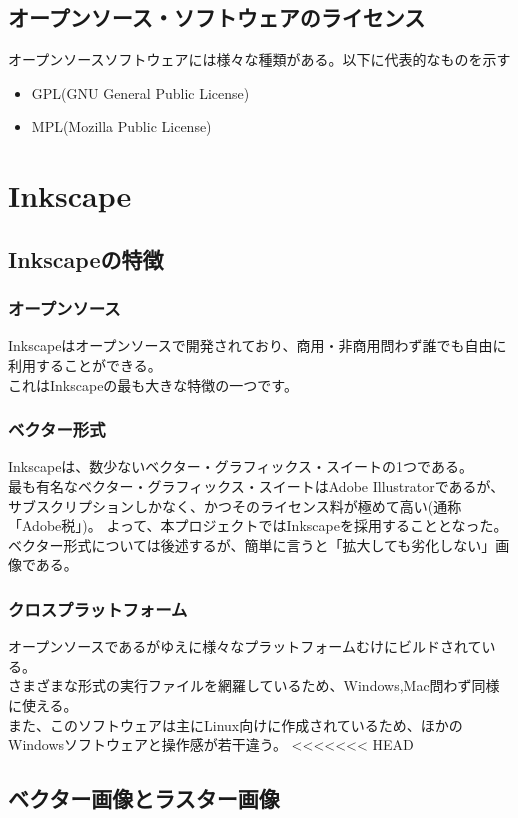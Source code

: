 \documentclass{ltjsarticle}
\begin{document}
\subsection{オープンソース・ソフトウェアのライセンス}
オープンソースソフトウェアには様々な種類がある。以下に代表的なものを示す
\begin{itemize}
    \item GPL(GNU General Public License)
    \item MPL(Mozilla Public License)
\end{itemize}
\section{Inkscape}
\subsection{Inkscapeの特徴}
\subsubsection{オープンソース}
Inkscapeはオープンソースで開発されており、商用・非商用問わず誰でも自由に利用することができる。\\
これはInkscapeの最も大きな特徴の一つです。
\subsubsection{ベクター形式}
Inkscapeは、数少ないベクター・グラフィックス・スイートの1つである。\\
最も有名なベクター・グラフィックス・スイートはAdobe Illustratorであるが、サブスクリプションしかなく、かつそのライセンス料が極めて高い(通称「Adobe税」)。
よって、本プロジェクトではInkscapeを採用することとなった。\\
ベクター形式については後述するが、簡単に言うと「拡大しても劣化しない」画像である。\\
\subsubsection{クロスプラットフォーム}
オープンソースであるがゆえに様々なプラットフォームむけにビルドされている。\\
さまざまな形式の実行ファイルを網羅しているため、Windows,Mac問わず同様に使える。\\
また、このソフトウェアは主にLinux向けに作成されているため、ほかのWindowsソフトウェアと操作感が若干違う。
<<<<<<< HEAD
\subsection{ベクター画像とラスター画像}
\end{document}
